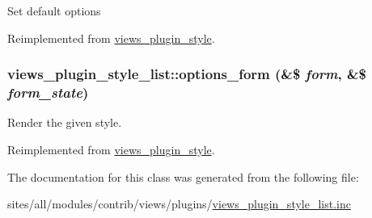Set default options 

Reimplemented from \hyperlink{classviews__plugin__style_95b6f2eadf403ff36f1ff2860294b3c2}{views\_\-plugin\_\-style}.\hypertarget{classviews__plugin__style__list_37ec2449bb2119e4a8c3730cd458ecdb}{
\subsubsection[{options\_\-form}]{\setlength{\rightskip}{0pt plus 5cm}views\_\-plugin\_\-style\_\-list::options\_\-form (\&\$ {\em form}, \/  \&\$ {\em form\_\-state})}}
\label{classviews__plugin__style__list_37ec2449bb2119e4a8c3730cd458ecdb}


Render the given style. 

Reimplemented from \hyperlink{classviews__plugin__style_fe3d437ff4398315b15c4e60975dbb1c}{views\_\-plugin\_\-style}.

The documentation for this class was generated from the following file:\begin{CompactItemize}
\item 
sites/all/modules/contrib/views/plugins/\hyperlink{views__plugin__style__list_8inc}{views\_\-plugin\_\-style\_\-list.inc}\end{CompactItemize}
